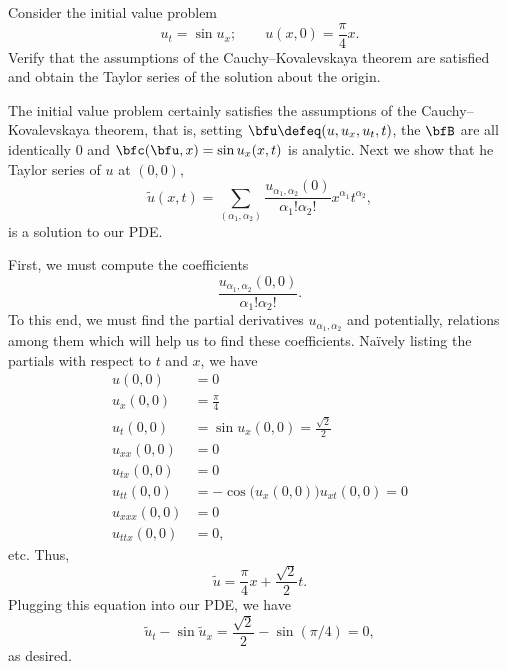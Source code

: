 \begin{problem}
  Consider the initial value problem
  \[
    u_t=\sin u_x;\qquad u(x,0)=\frac{\pi}{4}x.
  \]
  Verify that the assumptions of the Cauchy--Kovalevskaya theorem are
  satisfied and obtain the Taylor series of the solution about the origin.
\end{problem}
\begin{solution}
  The initial value problem certainly satisfies the assumptions of the
  Cauchy--Kovalevskaya theorem, that is, setting
  \(\bfu\defeq(u,u_x,u_t,t)\), the \(\bfB\) are all identically \(0\) and
  \(\bfc(\bfu,x)=\sin u_x(x,t)\) is analytic. Next we show that he Taylor
  series of \(u\) at \((0,0)\),
  \[
    \tilde u(x,t)=\sum_{(\alpha_1,\alpha_2)}
    \frac{u_{\alpha_1,\alpha_2}(0)}{\alpha_1!\alpha_2!} x^{\alpha_1}t^{\alpha_2},
  \]
  is a solution to our PDE.

  First, we must compute the coefficients
  \[
    \frac{u_{\alpha_1,\alpha_2}(0,0)}{\alpha_1!\alpha_2!}.
  \]
  To this end, we must find the partial derivatives
  \(u_{\alpha_1,\alpha_2}\) and potentially, relations among them which
  will help us to find these coefficients. Naïvely listing the partials
  with respect to \(t\) and \(x\), we have
  \begin{align*}
    u(0,0)&=0\\
    u_x(0,0)&=\frac{\pi}{4}\\
    u_t(0,0)&=\sin u_x(0,0)=\frac{\sqrt{2}}{2}\\
    u_{xx}(0,0)&=0\\
    u_{tx}(0,0)&=0\\
    u_{tt}(0,0)&=-\cos\bigl(u_x(0,0)\bigr)u_{xt}(0,0)=0\\
    u_{xxx}(0,0)&=0\\
    u_{ttx}(0,0)&=0,
  \end{align*}
  etc. Thus,
  \[
    \tilde u=\frac{\pi}{4}x+\frac{\sqrt{2}}{2}t.
  \]
  Plugging this equation into our PDE, we have
  \[
    \tilde u_t-\sin\tilde u_x=\frac{\sqrt{2}}{2}-\sin(\pi/4)=0,
  \]
  as desired.
\end{solution}
\newpage

